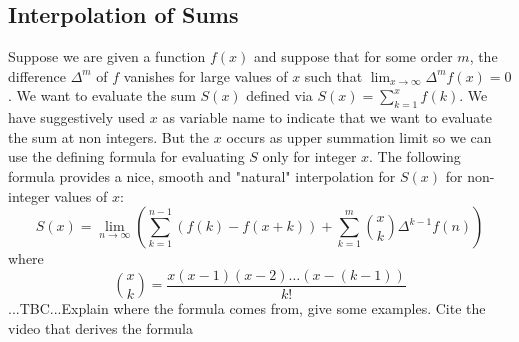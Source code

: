 \subsection{Interpolation of Sums}
Suppose we are given a function $f(x)$ and suppose that for some order $m$, the difference $\Delta^m$ of $f$ vanishes for large values of $x$ such that $\lim_{x \rightarrow \infty} \Delta^m f(x) = 0$. We want to evaluate the sum $S(x)$ defined via $S(x) = \sum_{k=1}^{x} f(k)$. We have suggestively used $x$ as variable name to indicate that we want to evaluate the sum at non integers. But the $x$ occurs as upper summation limit so we can use the defining formula for evaluating $S$ only for integer $x$. The following formula provides a nice, smooth and "natural" interpolation for $S(x)$ for non-integer values of $x$:
\begin{equation}
S(x) = \lim_{n \rightarrow \infty} 
\left(   \sum_{k=1}^{n-1} \left(f(k) - f(x+k) \right) 
       + \sum_{k=1}^{m} \binom{x}{k} \Delta^{k-1} f(n)  \right)
\end{equation}
where
\begin{equation}
\binom{x}{k} = \frac{x (x-1) (x-2) \ldots (x-(k-1)) }{k!}
\end{equation}
...TBC...Explain where the formula comes from, give some examples. Cite the video that derives the formula





